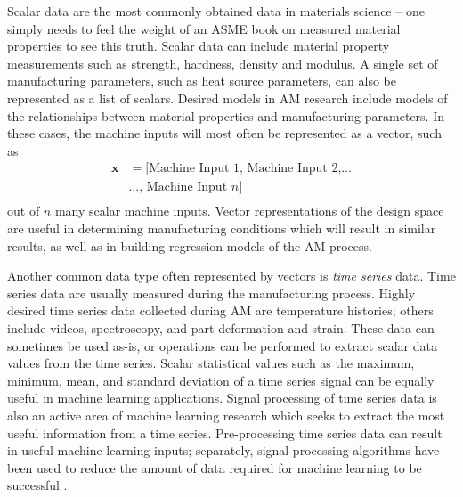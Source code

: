Scalar data are the most commonly obtained data in materials science -- one simply needs to feel the weight of an ASME book on measured material properties to see this truth. Scalar data can include material property measurements such as strength, hardness, density and modulus. A single set of manufacturing parameters, such as heat source parameters, can also be represented as a list of scalars. Desired models in AM research include models of the relationships between material properties and manufacturing parameters. In these cases, the machine inputs will most often be represented as a vector, such as
\begin{equation}
\begin{split}
	\mathbf{x} & = \text{[} \text{Machine Input 1, Machine Input 2,} \hdots  \\
		& \hdots \text{, Machine Input } n \text{]} \\
	\label{vector}
\end{split}
\end{equation}
out of $n$ many scalar machine inputs. Vector representations of the design space are useful in determining manufacturing conditions which will result in similar results, as well as in building regression models of the AM process.


Another common data type often represented by vectors is \textit{time series} data. Time series data are usually measured during the manufacturing process. Highly desired time series data collected during AM are temperature histories; others include videos, spectroscopy, and part deformation and strain. These data can sometimes be used as-is, or operations can be performed to extract scalar data values from the time series. Scalar statistical values such as the maximum, minimum, mean, and standard deviation of a time series signal can be equally useful in machine learning applications. Signal processing of time series data is also an active area of machine learning research which seeks to extract the most useful information from a time series. Pre-processing time series data can result in useful machine learning inputs; separately, signal processing algorithms have been used to reduce the amount of data required for machine learning to be successful \cite{Candes2008}.

